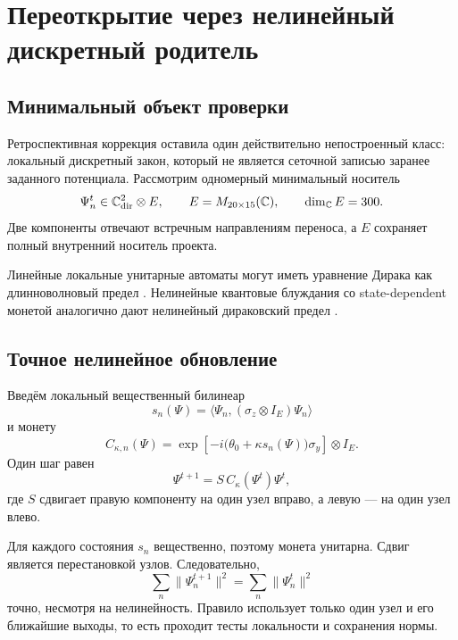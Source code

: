 \chapter{Переоткрытие через нелинейный дискретный родитель}
\label{ch:v6-spectral-transition-discrete-nonlinear-parent-reopening-gate}

\section{Минимальный объект проверки}

Ретроспективная коррекция оставила один действительно непостроенный класс:
локальный дискретный закон, который не является сеточной записью заранее
заданного потенциала. Рассмотрим одномерный минимальный носитель
\begin{equation}
 \Psi_n^t\in\mathbb C^2_{\rm dir}\otimes E,
 \qquad E=M_{20\times15}(\mathbb C),
 \qquad \dim_{\mathbb C}E=300.
\end{equation}
Две компоненты отвечают встречным направлениям переноса, а $E$ сохраняет
полный внутренний носитель проекта.

Линейные локальные унитарные автоматы могут иметь уравнение Дирака как
длинноволновый предел \cite{discrete-parent-bialynicki1994,
discrete-parent-bisio2015}. Нелинейные квантовые блуждания со
state-dependent монетой аналогично дают нелинейный дираковский предел
\cite{discrete-parent-angles2023,discrete-parent-continuous-limits2019}.

\section{Точное нелинейное обновление}

Введём локальный вещественный билинеар
\begin{equation}
 s_n(\Psi)=
 \langle\Psi_n,(\sigma_z\otimes I_E)\Psi_n\rangle
\end{equation}
и монету
\begin{equation}
 C_{\kappa,n}(\Psi)=
 \exp\!\left[-i\bigl(\theta_0+\kappa s_n(\Psi)\bigr)
 \sigma_y\right]\otimes I_E.
 \label{eq:v6-discrete-parent-coin}
\end{equation}
Один шаг равен
\begin{equation}
 \Psi^{t+1}=S\,C_\kappa(\Psi^t)\Psi^t,
 \label{eq:v6-discrete-parent-update}
\end{equation}
где $S$ сдвигает правую компоненту на один узел вправо, а левую --- на
один узел влево.

Для каждого состояния $s_n$ вещественно, поэтому монета унитарна. Сдвиг
является перестановкой узлов. Следовательно,
\begin{equation}
 \sum_n\|\Psi_n^{t+1}\|^2=\sum_n\|\Psi_n^t\|^2
\end{equation}
точно, несмотря на нелинейность. Правило использует только один узел и его
ближайшие выходы, то есть проходит тесты локальности и сохранения нормы.


